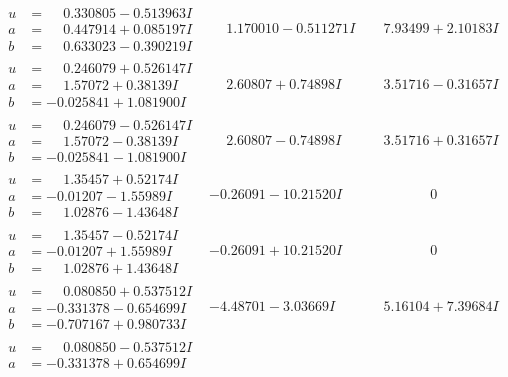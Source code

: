 \documentclass[1p]{elsarticle_modified}
\theoremstyle{definition}
\begin{document}
$$\begin{array}{c|c|c}
 \hline 
\begin{aligned}
u &= \phantom{-}0.330805 - 0.513963 I \\
a &= \phantom{-}0.447914 + 0.085197 I \\
b &= \phantom{-}0.633023 - 0.390219 I\end{aligned}
 & \phantom{-}1.170010 - 0.511271 I & \phantom{-}7.93499 + 2.10183 I \\ \hline\begin{aligned}
u &= \phantom{-}0.246079 + 0.526147 I \\
a &= \phantom{-}1.57072 + 0.38139 I \\
b &= -0.025841 + 1.081900 I\end{aligned}
 & \phantom{-}2.60807 + 0.74898 I & \phantom{-}3.51716 - 0.31657 I \\ \hline\begin{aligned}
u &= \phantom{-}0.246079 - 0.526147 I \\
a &= \phantom{-}1.57072 - 0.38139 I \\
b &= -0.025841 - 1.081900 I\end{aligned}
 & \phantom{-}2.60807 - 0.74898 I & \phantom{-}3.51716 + 0.31657 I \\ \hline\begin{aligned}
u &= \phantom{-}1.35457 + 0.52174 I \\
a &= -0.01207 - 1.55989 I \\
b &= \phantom{-}1.02876 - 1.43648 I\end{aligned}
 & -0.26091 - 10.21520 I & \phantom{-0.000000 } 0 \\ \hline\begin{aligned}
u &= \phantom{-}1.35457 - 0.52174 I \\
a &= -0.01207 + 1.55989 I \\
b &= \phantom{-}1.02876 + 1.43648 I\end{aligned}
 & -0.26091 + 10.21520 I & \phantom{-0.000000 } 0 \\ \hline\begin{aligned}
u &= \phantom{-}0.080850 + 0.537512 I \\
a &= -0.331378 - 0.654699 I \\
b &= -0.707167 + 0.980733 I\end{aligned}
 & -4.48701 - 3.03669 I & \phantom{-}5.16104 + 7.39684 I \\ \hline\begin{aligned}
u &= \phantom{-}0.080850 - 0.537512 I \\
a &= -0.331378 + 0.654699 I \\

\end{aligned}
\end{array}$$
\end{document}
